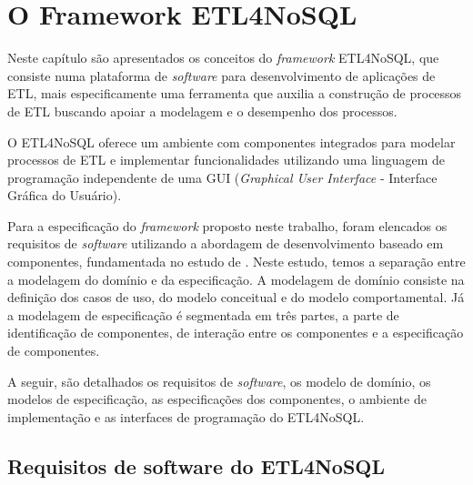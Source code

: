 \chapter{O Framework ETL4NoSQL}
Neste capítulo são apresentados os conceitos do \textit{framework} ETL4NoSQL, que consiste numa plataforma de \textit{software} para desenvolvimento de aplicações de ETL, mais especificamente uma ferramenta que auxilia a construção de processos de ETL buscando apoiar a modelagem e o desempenho dos processos. 

O ETL4NoSQL oferece um ambiente com componentes integrados para modelar processos de ETL e implementar funcionalidades utilizando uma linguagem de programação independente de uma GUI (\emph{Graphical User Interface} - Interface Gráfica do Usuário).


Para a especificação do \textit{framework} proposto neste trabalho, foram elencados os requisitos de \textit{software} utilizando a abordagem de desenvolvimento baseado em componentes, fundamentada no estudo de \cite{cheesman:2001}. Neste estudo, temos a separação entre a modelagem do domínio e da especificação. A modelagem de domínio consiste na definição dos casos de uso, do modelo conceitual e do modelo comportamental. Já a modelagem de especificação é segmentada em três partes, a parte de identificação de componentes, de interação entre os componentes e a especificação de componentes.  


A seguir, são detalhados os requisitos de \textit{software}, os modelo de domínio, os modelos de especificação, as especificações dos componentes, o ambiente de implementação e as interfaces de programação do ETL4NoSQL.


\clearpage
\section{Requisitos de software do ETL4NoSQL}


